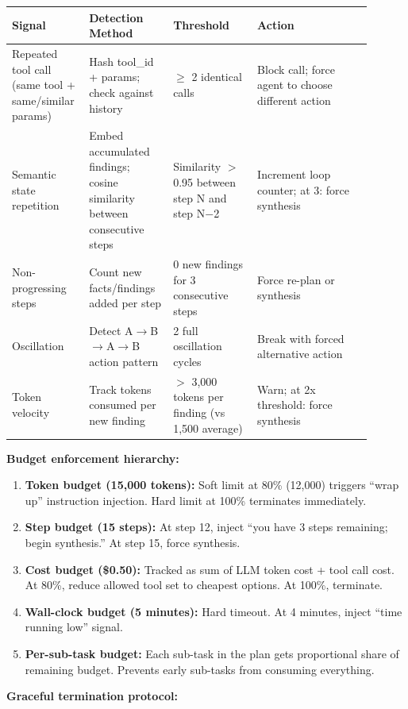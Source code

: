 \begin{tabular}{|p{0.16\linewidth}|p{0.22\linewidth}|p{0.22\linewidth}|p{0.30\linewidth}|}
\hline
\textbf{Signal} & \textbf{Detection Method} & \textbf{Threshold} & \textbf{Action} \\
\hline
Repeated tool call (same tool + same/similar params) & Hash tool\_id + params; check against history & $\geq$ 2 identical calls & Block call; force agent to choose different action \\
\hline
Semantic state repetition & Embed accumulated findings; cosine similarity between consecutive steps & Similarity $>$ 0.95 between step N and step N$-$2 & Increment loop counter; at 3: force synthesis \\
\hline
Non-progressing steps & Count new facts/findings added per step & 0 new findings for 3 consecutive steps & Force re-plan or synthesis \\
\hline
Oscillation & Detect A$\rightarrow$B$\rightarrow$A$\rightarrow$B action pattern & 2 full oscillation cycles & Break with forced alternative action \\
\hline
Token velocity & Track tokens consumed per new finding & $>$ 3,000 tokens per finding (vs 1,500 average) & Warn; at 2x threshold: force synthesis \\
\hline
\end{tabular}

\textbf{Budget enforcement hierarchy:}

\begin{enumerate}
  \item \textbf{Token budget (15,000 tokens):} Soft limit at 80\% (12,000) triggers ``wrap up'' instruction injection. Hard limit at 100\% terminates immediately.
  \item \textbf{Step budget (15 steps):} At step 12, inject ``you have 3 steps remaining; begin synthesis.'' At step 15, force synthesis.
  \item \textbf{Cost budget (\$0.50):} Tracked as sum of LLM token cost + tool call cost. At 80\%, reduce allowed tool set to cheapest options. At 100\%, terminate.
  \item \textbf{Wall-clock budget (5 minutes):} Hard timeout. At 4 minutes, inject ``time running low'' signal.
  \item \textbf{Per-sub-task budget:} Each sub-task in the plan gets proportional share of remaining budget. Prevents early sub-tasks from consuming everything.
\end{enumerate}

\textbf{Graceful termination protocol:}

